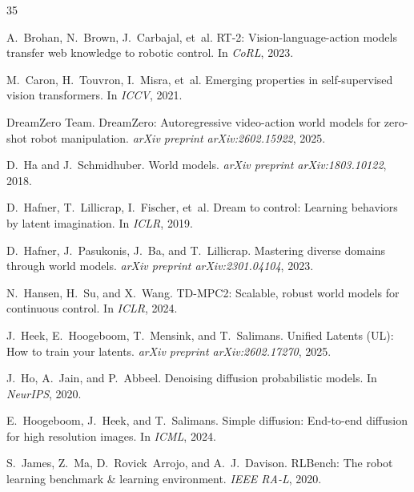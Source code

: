 \documentclass{article}
\begin{document}
\begin{thebibliography}{35}

A.~Brohan, N.~Brown, J.~Carbajal, et~al.
\newblock RT-2: Vision-language-action models transfer web knowledge to robotic control.
\newblock In \emph{CoRL}, 2023.

M.~Caron, H.~Touvron, I.~Misra, et~al.
\newblock Emerging properties in self-supervised vision transformers.
\newblock In \emph{ICCV}, 2021.

DreamZero Team.
\newblock DreamZero: Autoregressive video-action world models for zero-shot robot manipulation.
\newblock \emph{arXiv preprint arXiv:2602.15922}, 2025.

D.~Ha and J.~Schmidhuber.
\newblock World models.
\newblock \emph{arXiv preprint arXiv:1803.10122}, 2018.

D.~Hafner, T.~Lillicrap, I.~Fischer, et~al.
\newblock Dream to control: Learning behaviors by latent imagination.
\newblock In \emph{ICLR}, 2019.

D.~Hafner, J.~Pasukonis, J.~Ba, and T.~Lillicrap.
\newblock Mastering diverse domains through world models.
\newblock \emph{arXiv preprint arXiv:2301.04104}, 2023.

N.~Hansen, H.~Su, and X.~Wang.
\newblock TD-MPC2: Scalable, robust world models for continuous control.
\newblock In \emph{ICLR}, 2024.

J.~Heek, E.~Hoogeboom, T.~Mensink, and T.~Salimans.
\newblock Unified Latents (UL): How to train your latents.
\newblock \emph{arXiv preprint arXiv:2602.17270}, 2025.

J.~Ho, A.~Jain, and P.~Abbeel.
\newblock Denoising diffusion probabilistic models.
\newblock In \emph{NeurIPS}, 2020.

E.~Hoogeboom, J.~Heek, and T.~Salimans.
\newblock Simple diffusion: End-to-end diffusion for high resolution images.
\newblock In \emph{ICML}, 2024.

S.~James, Z.~Ma, D.~Rovick~Arrojo, and A.~J.~Davison.
\newblock RLBench: The robot learning benchmark \& learning environment.
\newblock \emph{IEEE RA-L}, 2020.


\end{thebibliography}
\end{document}
